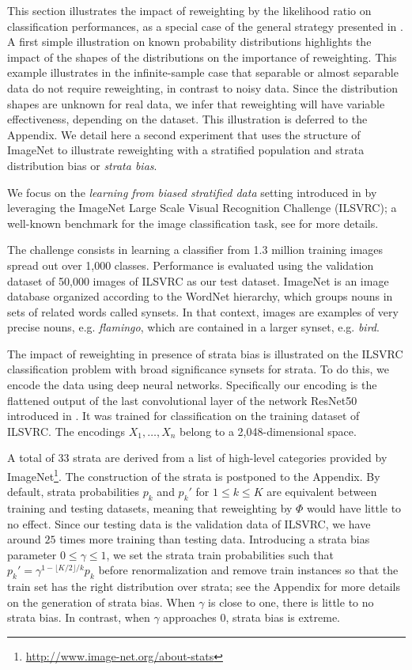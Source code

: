 \documentclass[12pt]{article}
\begin{document}
This section illustrates the impact of reweighting by the likelihood ratio on
classification performances, as a special case of the general strategy presented
in . A first simple illustration on known probability distributions
highlights the impact of the shapes of the distributions on the importance of
reweighting. This example illustrates in the infinite-sample case that
separable or almost separable data do not require reweighting, in contrast
to noisy data.  Since the distribution shapes are unknown for real data, we
infer that reweighting will have variable effectiveness, depending on the
dataset. This illustration is deferred to the Appendix.
We detail here a second experiment that uses the structure of
ImageNet to illustrate reweighting with a stratified population and strata
distribution bias or \emph{strata bias}. 


We focus on the \textit{learning
from biased stratified data} setting introduced in 
by leveraging the ImageNet Large Scale Visual Recognition Challenge
(ILSVRC); a well-known benchmark for the image classification task, see
\cite{DBLP:journals/corr/RussakovskyDSKSMHKKBBF14} for more details.

The challenge consists in
learning a classifier from 1.3 million training images spread out over 1,000
classes. Performance is evaluated using the validation dataset of 50,000
images of ILSVRC as our test dataset. ImageNet is an image database
organized according to the WordNet hierarchy, which groups nouns in sets
of related words called synsets. In that context, images are examples of
very precise nouns, e.g. \emph{flamingo}, which are contained in a larger
synset, e.g. \emph{bird}.

The impact of reweighting in presence of strata bias is illustrated on the ILSVRC
classification problem with broad significance synsets for strata. To do this,
we encode the data using deep neural networks. Specifically our encoding is the
flattened output of the last convolutional layer of the network ResNet50
introduced in \cite{DBLP:journals/corr/HeZRS15}. It was trained for
classification on the training dataset of ILSVRC. The encodings
$X_1, \dots, X_n$ belong to a 2,048-dimensional space.

A total of 33 strata are derived from a list of high-level categories provided
by ImageNet\footnote{\url{http://www.image-net.org/about-stats}}. The
construction of the strata is postponed to the Appendix. By default, strata
probabilities $p_k$ and $p_k'$ for $1 \le k \le K$ are equivalent between
training and testing datasets, meaning that reweighting by $\Phi$ would have
little to no effect. Since our testing data is the validation data of ILSVRC,
we have around $25$ times more training than testing data. Introducing a strata
bias parameter $0 \le \gamma \le 1$, we set the strata train probabilities such
that $p_k' = \gamma^{1 - \lfloor K/2 \rfloor/k} p_k$ before renormalization and
remove train instances so that the train set has the right distribution over
strata; see the Appendix for more details on the generation of strata bias.
When $\gamma$ is close to one, there is little to no strata bias. In contrast,
when $\gamma$ approaches $0$, strata bias is extreme.
\end{document}
